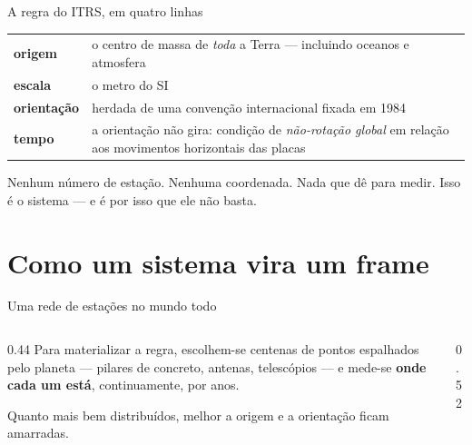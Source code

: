 \documentclass[aspectratio=169,11pt]{beamer}
\newcommand{\bnum}[1]{\textbf{\textcolor{mTeal}{#1}}}
\begin{document}
\begin{frame}{A regra do ITRS, em quatro linhas}
  \centering
  \small
  \renewcommand{\arraystretch}{1.45}
  \begin{tabular}{lp{8.1cm}}
    \toprule
    \textbf{origem} & o centro de massa de \emph{toda} a Terra --- incluindo oceanos e
      atmosfera \\
    \textbf{escala} & o metro do SI \\
    \textbf{orientação} & herdada de uma convenção internacional fixada em 1984 \\
    \textbf{tempo} & a orientação não gira: condição de \emph{não-rotação global} em relação
      aos movimentos horizontais das placas \\
    \bottomrule
  \end{tabular}
  \bigskip

  \begin{cuidado}[title={Repare no que não tem aqui}]
    Nenhum número de estação. Nenhuma coordenada. \alert{Nada que dê para medir.}
    Isso é o sistema --- e é por isso que ele não basta.
  \end{cuidado}
\end{frame}

\section{Como um sistema vira um frame}

\begin{frame}{Uma rede de estações no mundo todo}
  \begin{columns}[T]
    \begin{column}{0.44\textwidth}
      Para materializar a regra, escolhem-se centenas de pontos espalhados pelo planeta ---
      pilares de concreto, antenas, telescópios --- e mede-se \bnum{onde cada um está},
      continuamente, por anos.
      \medskip

      Quanto mais bem distribuídos, melhor a origem e a orientação ficam amarradas.
    \end{column}
    \begin{column}{0.52\textwidth}
      \centering
    \end{column}
  \end{columns}
\end{frame}
\end{document}
